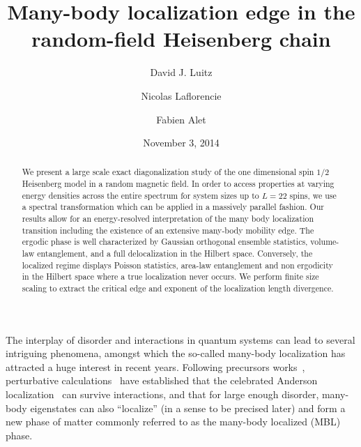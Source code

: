 \documentclass[prl,a4paper,twocolumn,groupedaddress,english,showpacs]{revtex4-1}
\begin{document}
\title{Many-body localization edge in the random-field Heisenberg chain} \author{David J. Luitz}
  
\author{Nicolas Laflorencie}
\author{Fabien Alet}  
\date{November 3, 2014}



\begin{abstract} We present a large scale exact diagonalization study of the one dimensional spin
    $1/2$ Heisenberg model in a random magnetic field. In order to access properties at
    varying energy densities across the entire spectrum for system sizes up to $L=22$ spins, we use
    a spectral transformation which can be applied in a massively parallel fashion. Our results
    allow for an energy-resolved interpretation of the many body localization transition including
    the existence of an extensive many-body mobility edge.  The ergodic phase is well characterized by
    Gaussian orthogonal ensemble statistics, volume-law entanglement, and a full delocalization in the Hilbert space. Conversely,
    the localized regime displays Poisson statistics, area-law entanglement and 
    non ergodicity in the Hilbert space where a true localization never occurs. We perform finite
    size scaling to extract the critical edge and exponent of the localization length divergence.  
    \end{abstract} 
\maketitle
%
The interplay of disorder and interactions in quantum systems can lead to several intriguing
phenomena, amongst which the so-called many-body localization has attracted a huge interest in
recent years. Following precursors
works~\cite{fleishman_interactions_1980,altshuler_quasiparticle_1997,jacquod_emergence_1997,georgeot_integrability_1998},
perturbative calculations~\cite{gornyi_interacting_2005,basko_metalinsulator_2006} have established that the celebrated Anderson localization~\cite{anderson_absence_1958} can survive
interactions, and that for large enough disorder, many-body eigenstates can also ``localize'' (in a
sense to be precised later) and form a new phase of matter commonly referred to as the many-body
localized (MBL) phase.
\end{document}
